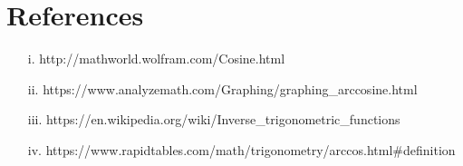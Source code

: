\documentclass[12pt]{article}
\begin{document}
	\section{References}
		\begin{enumerate}
		\item[i.] http://mathworld.wolfram.com/Cosine.html
		\item[ii.] https://www.analyzemath.com/Graphing/graphing\_arccosine.html
		\item[iii.] https://en.wikipedia.org/wiki/Inverse\_trigonometric\_functions
		\item[iv.] https://www.rapidtables.com/math/trigonometry/arccos.html\#definition
		\end{enumerate}
		
	
		
		
	
\end{document}
